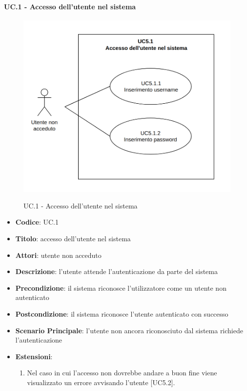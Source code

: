 	\paragraph{UC\theuccount.1 - Accesso dell'utente nel sistema}
		\begin{figure}[H]
			\centering
				\includegraphics[width=\columnwidth]{img/UC5_1.png}\\
			\caption{UC\theuccount.1 - Accesso dell'utente nel sistema}
		\end{figure}
		\begin{itemize}
			\item \textbf{Codice}: UC\theuccount.1
			\item \textbf{Titolo}: accesso dell'utente nel sistema
			\item \textbf{Attori}: utente non acceduto
			\item \textbf{Descrizione}: l'utente attende l'autenticazione da parte del sistema
			\item \textbf{Precondizione}: il sistema riconosce l'utilizzatore come un utente non autenticato
			\item \textbf{Postcondizione}: il sistema riconosce l'utente autenticato con successo
			\item \textbf{Scenario Principale}: l’utente non ancora riconosciuto dal sistema richiede l'autenticazione
			\item \textbf{Estensioni}:
			\begin{enumerate}
				\item Nel caso in cui l'accesso non dovrebbe andare a buon fine viene visualizzato un errore avvisando l'utente [UC5.2].
			\end{enumerate}
	\end{itemize}

